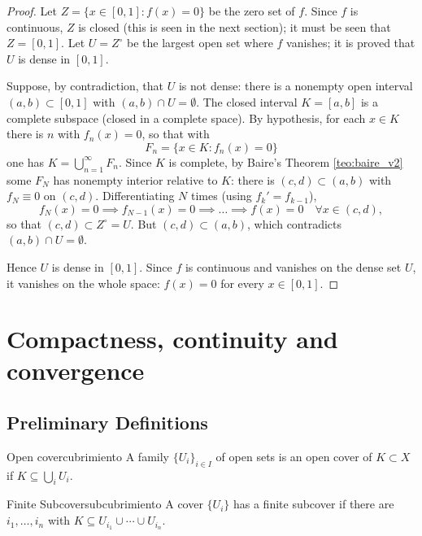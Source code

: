 \documentclass[11pt, a4paper]{article}
\begin{document}
\begin{proof}
Let $Z = \{ x \in [0, 1] : f(x) = 0 \}$ be the zero set of $f$. Since $f$ is continuous, $Z$ is
closed (this is seen in the next section); it must be seen that $Z = [0, 1]$. Let $U = Z^\circ$ be the largest
open set where $f$ vanishes; it is proved that $U$ is dense in $[0, 1]$.

Suppose, by contradiction, that $U$ is not dense: there is a nonempty open interval
$(a, b) \subset [0, 1]$ with $(a, b) \cap U = \emptyset$. The closed interval $K = [a, b]$ is a
complete subspace (closed in a complete space). By hypothesis, for each $x \in K$ there is $n$ with
$f_n(x) = 0$, so that with
$$ F_n = \{ x \in K : f_n(x) = 0 \} $$
one has $K = \bigcup_{n=1}^{\infty} F_n$. Since $K$ is complete, by Baire's Theorem
\ref{teo:baire_v2} some $F_N$ has nonempty interior relative to $K$: there is $(c, d) \subset (a, b)$
with $f_N \equiv 0$ on $(c, d)$. Differentiating $N$ times (using $f_k' = f_{k-1}$),
$$ f_N(x) = 0 \implies f_{N-1}(x) = 0 \implies \dots \implies f(x) = 0 \quad \forall x \in (c, d), $$
so that $(c, d) \subset Z^\circ = U$. But $(c, d) \subset (a, b)$, which contradicts
$(a, b) \cap U = \emptyset$.

Hence $U$ is dense in $[0, 1]$. Since $f$ is continuous and vanishes on the dense set $U$, it vanishes on
the whole space: $f(x) = 0$ for every $x \in [0, 1]$.
\end{proof}

\newpage

\section{Compactness, continuity and convergence}

\subsection{Preliminary Definitions}

\begin{definicion}{Open cover}{cubrimiento}
A family $\{U_i\}_{i \in I}$ of open sets is an open cover of $K \subset X$ if
$K \subseteq \bigcup_i U_i$.
\end{definicion}

\begin{definicion}{Finite Subcover}{subcubrimiento}
A cover $\{U_i\}$ has a finite subcover if there are $i_1, \dots, i_n$ with
$K \subseteq U_{i_1} \cup \cdots \cup U_{i_n}$.
\end{definicion}
\end{document}
